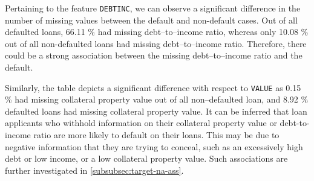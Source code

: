 Pertaining to the feature \texttt{DEBTINC}, we can observe a significant difference in the number of missing values between the default and non-default cases. Out of all defaulted loans, 66.11 \% had missing debt--to--income ratio, whereas only 10.08 \% out of all non-defaulted loans had missing debt--to--income ratio.
Therefore, there could be a strong association between the missing debt--to--income ratio and the default.

Similarly, the table depicts a significant difference with respect to \texttt{VALUE} as 0.15 \% had missing collateral property value out of all non--defaulted loan, and 8.92 \% defaulted loans had missing collateral property value.
It can be inferred that loan applicants who withhold information on their collateral property value or debt-to-income ratio are more likely to default on their loans.
This may be due to negative information that they are trying to conceal, such as an excessively high debt or low income, or a low collateral property value.
Such associations are further investigated in \autoref{subsubsec:target-na-ass}.


